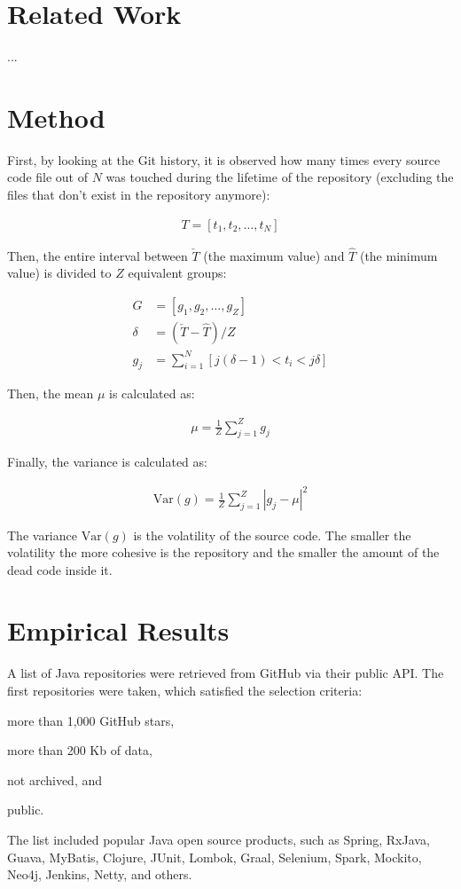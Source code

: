 \documentclass[12pt]{article}
\begin{document}
\section{Related Work}

...

\section{Method}
\label{sec:method}

First, by looking at the Git history,
it is observed how many times every source code file out of $N$ was touched
during the lifetime of the repository (excluding the files that don't exist
in the repository anymore):

\begin{eqnarray}
T = [t_1, t_2, \dots, t_N]
\end{eqnarray}

Then, the entire interval between $\check{T}$ (the maximum value)
and $\hat{T}$ (the minimum value) is divided to $Z$ equivalent groups:

\begin{align}
G &= [g_1, g_2, \dots, g_{Z}] \\
\delta &= ( \check{T} - \hat{T} ) / Z \\
g_j &= \sum_{i=1}^N [ j(\delta-1) < t_i < j\delta ]
\end{align}

Then, the mean $\mu$ is calculated as:

\begin{eqnarray}
\mu = \frac{1}{Z}\sum_{j=1}^{Z}{g_j}
\end{eqnarray}

Finally, the variance is calculated as:

\begin{eqnarray}
\text{Var}(g) = \frac{1}{Z}\sum_{j=1}^{Z}{|g_j - \mu|^2}
\end{eqnarray}

The variance $\text{Var}(g)$ is the volatility of the source code. The smaller
the volatility the more cohesive is the repository and the smaller
the amount of the dead code inside it.

\section{Empirical Results}

A list of Java repositories were retrieved from GitHub via their
public API. The first \thetotalrepos{} repositories were taken, which satisfied
the selection criteria:
\begin{enumerate*}[label={\arabic*)}]
\item more than 1,000 GitHub stars,
\item more than 200 Kb of data,
\item not archived, and
\item public.
\end{enumerate*}
The list included popular Java open source products, such as
Spring, RxJava, Guava, MyBatis, Clojure, JUnit, Lombok,
Graal, Selenium, Spark, Mockito, Neo4j, Jenkins, Netty, and others.
\end{document}
